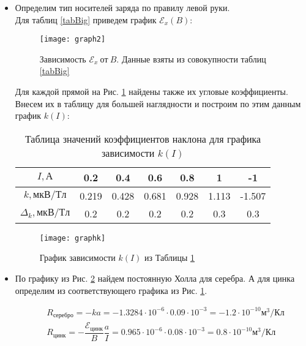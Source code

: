 \documentclass{lab}
\begin{document}
\begin{itemize}
\item
Определим тип носителей заряда по правилу левой руки.\\
Для таблиц \ref{tabBig} приведем график $ \mathscr{E}_x(B) $:

\begin{figure}[H]
	\centering
	\texttt{[image: graph2]}
	\caption{\footnotesize Зависимость $\mathscr{E}_x~от~B$. Данные взяты из совокупности таблиц \ref{tabBig}}
	\label{mnogo}
\end{figure}

Для каждой прямой на Рис. \ref{mnogo} найдены также их угловые коэффициенты. Внесем их в таблицу для большей наглядности и построим по этим данным график $ k(I) $:

\begin{table}[H]
	\centering
	\renewcommand{\arraystretch}{1.3}
	\begin{tabular}{|c|cccccc|}
		\hline
		$ I, А $				& 0.2	& 0.4	& 0.6	& 0.8	& 1		& -1	\\ \hline
		$ k, мкВ/Тл $			& 0.219	& 0.428 & 0.681 & 0.928 & 1.113 & -1.507	\\ \hline
		$ \Delta_k, мкВ/Тл $	& 0.2	& 0.2	& 0.2	& 0.2	& 0.3	& 0.3 \\ \hline
	\end{tabular}
	\renewcommand{\arraystretch}{1}
	\caption{\footnotesize Таблица значений коэффициентов наклона для графика зависимости $k(I)$}
	\label{tabk}
\end{table}

\begin{figure}[H]
	\centering
	\texttt{[image: graphk]}
	\caption{\footnotesize  График зависимости $k(I)$ из Таблицы \ref{tabk}}
	\label{ki}
\end{figure}

\item
По графику из Рис. \ref{ki} найдем постоянную Холла для серебра.
А для цинка определим из соответствующего графика из Рис. \ref{mnogo}.

\begin{equation}
\begin{aligned}
	&R_{серебро} = -ka = - 1.3284 \cdot 10^{-6} \cdot 0.09 \cdot 10^{-3} = -1.2 \cdot 10^{-10} м^3/Кл\\
	&R_{цинк} = - \dfrac{\mathscr{E}_{цинк}}{B} \dfrac{a}{I} = 0.965 \cdot 10^{-6} \cdot 0.08 \cdot 10^{-3} = 0.8 \cdot 10^{-10} м^3/Кл
\end{aligned}
\end{equation}


\end{itemize}
\end{document}
